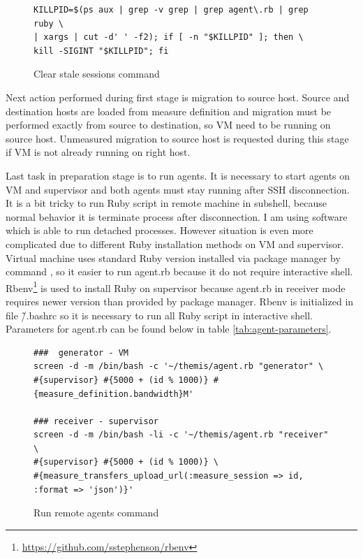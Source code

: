 \begin{figure}[htb]
\caption{Clear stale sessions command}
\label{cmd:killcmd}
\begin{verbatim}
KILLPID=$(ps aux | grep -v grep | grep agent\.rb | grep ruby \
| xargs | cut -d' ' -f2); if [ -n "$KILLPID" ]; then \
kill -SIGINT "$KILLPID"; fi 
\end{verbatim}
\end{figure}

Next action performed during first stage is migration to source host. Source and destination hosts are loaded from measure definition and migration must be performed exactly from source to destination, so \Ac{VM} need to be running on source host. Unmeasured migration to source host is requested during this stage if \Ac{VM} is not already running on right host.

Last task in preparation stage is to run agents. It is necessary to start agents on \Ac{VM} and supervisor and both agents must stay running after \Ac{SSH} disconnection. It is a bit tricky to run Ruby script in remote machine in subshell, because normal behavior it is terminate process after disconnection. I am using \Cmd{screen} software which is able to run detached processes. However situation is even more complicated due to different Ruby installation methods on \Ac{VM} and supervisor. Virtual machine uses standard Ruby version installed via package manager by command , so it easier to run agent.rb because it do not require interactive shell. Rbenv\footnote{\url{https://github.com/sstephenson/rbenv}} is used to install Ruby on supervisor because agent.rb in receiver mode requires newer version than provided by package manager. Rbenv is initialized in file \~/.bashrc so it is necessary to run all Ruby script in interactive shell. Parameters for agent.rb can be found below in table \ref{tab:agent-parameters}.

\begin{figure}[htb]
\caption{Run remote agents command}
\label{cmd:remote agents}
\begin{verbatim}
###  generator - VM
screen -d -m /bin/bash -c '~/themis/agent.rb "generator" \
#{supervisor} #{5000 + (id % 1000)} #{measure_definition.bandwidth}M'

### receiver - supervisor
screen -d -m /bin/bash -li -c '~/themis/agent.rb "receiver" \
#{supervisor} #{5000 + (id % 1000)} \
#{measure_transfers_upload_url(:measure_session => id, :format => 'json')}'
\end{verbatim}
\end{figure}

